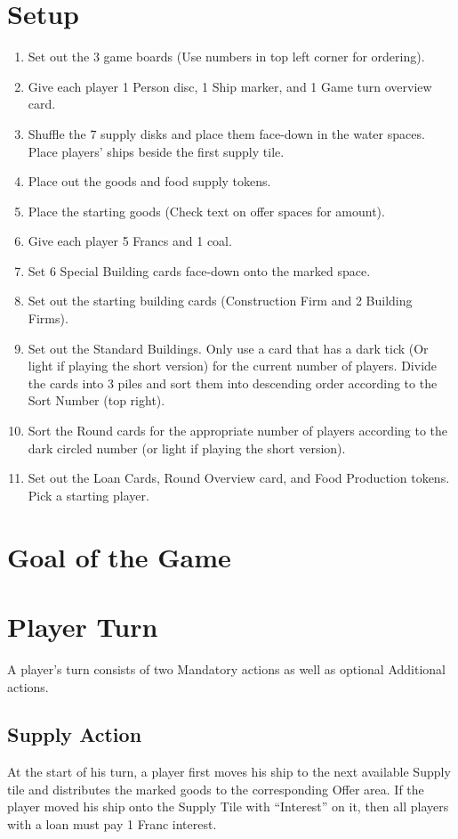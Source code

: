 \documentclass[12pt]{article}
\newenvironment{enumerateCustom}
{\begin{enumerate}
  \setlength{\itemsep}{1pt}
  \setlength{\parskip}{0pt}
  \setlength{\parsep}{0pt}}
{\end{enumerate}}
\begin{document}
\begin{multicols*}{2}

\section*{Setup}
\begin{enumerateCustom}
	\item Set out the 3 game boards (Use numbers in top left corner for ordering).
	\item Give each player 1 Person disc, 1 Ship marker, and 1 Game turn overview card.
	\item Shuffle the 7 supply disks and place them face-down in the water spaces. Place players' ships beside the first supply tile.
	\item Place out the goods and food supply tokens.
	\item Place the starting goods (Check text on offer spaces for amount).
	\item Give each player 5 Francs and 1 coal.
	\item Set 6 Special Building cards face-down onto the marked space.
	\item Set out the starting building cards (Construction Firm and 2 Building Firms).
	\item Set out the Standard Buildings. Only use a card that has a dark tick (Or light if playing the short version) for the current number of players. Divide the cards into 3 piles and sort them into descending order according to the Sort Number (top right).
	\item Sort the Round cards for the appropriate number of players according to the dark circled number (or light if playing the short version).
	\item Set out the Loan Cards, Round Overview card, and Food Production tokens. Pick a starting player.
\end{enumerateCustom}

\section*{Goal of the Game}

\section*{Player Turn}
A player's turn consists of two Mandatory actions as well as optional Additional actions. 

\subsection*{Supply Action}
At the start of his turn, a player first moves his ship to the next available Supply tile and distributes the marked goods to the corresponding Offer area. If the player moved his ship onto the Supply Tile with ``Interest'' on it, then all players with a loan must pay 1 Franc interest.


\end{multicols*}
\end{document}
